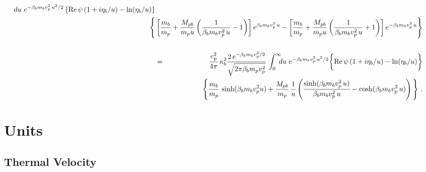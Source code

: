\documentclass[preprint,12pt,eqsecnum,nofootinbib,amsmath,amssymb]{revtex4}
\begin{document}
\begin{eqnarray}
  \hskip-0.2cm du ~e^{-\beta_b m_b v_p^2\, u^2/2}
  \left\{ {\rm Re} \, \psi \left( 1 + i \eta_b/u
  \right) - \ln(\eta_b/u)  \right\} 
\nonumber\\ \nonumber
  && \hskip-1cm 
  \Bigg\{ \left[ \frac{m_b}{m_p} + {M_{pb} \over m_p u}
  \left( { 1 \over \beta_b m_b v_p^2\, u } - 1
  \right) \right] e^{\beta_b m_b v_p^2\, u}
  - \left[ \frac{m_b}{m_p} + {M_{pb} \over m_p u} 
  \left( { 1 \over \beta_b m_b v_p^2\,u } + 1 \right)
  \right]e^{- \beta_b m_b v_p^2\, u } \Bigg\} 
\\[15pt]
  &=&
  { e_p^2 \over 4 \pi } \,
  \kappa^2_b  \frac{2\,e^{-\beta_b m_b v_p^2/2} }
  {\sqrt{2\pi\beta_b m_p v_p^2} }\,\int_0^\infty 
  \hskip-0.2cm du ~e^{-\beta_b m_b v_p^2\, u^2/2}
  \bigg\{ {\rm Re} \, \psi \left( 1 + i \eta_b/u
  \right) - \ln(\eta_b/u)  \bigg\}
\nonumber\\ \nonumber
  && 
  \Bigg\{ \frac{m_b}{m_p}\, \sinh(\beta_b m_b v_p^2 u) 
  + {M_{pb} \over m_p} \, \frac{1}{ u} \left( 
  { \sinh(\beta_b m_b v_p^2\, u) \over \beta_b m_b v_p^2\, u } 
  - \cosh(\beta_b m_b v_p^2\, u) \right) \Bigg\} \ .
\end{eqnarray}


\clearpage
\section{Units}

\subsection{Thermal Velocity} 
\end{document}
